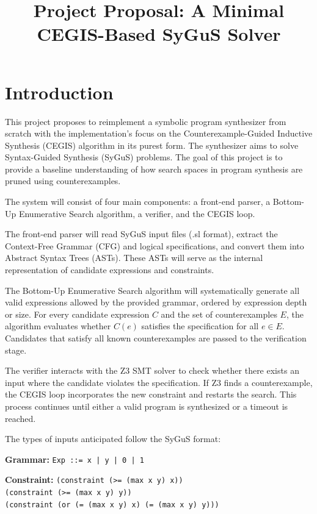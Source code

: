 \documentclass[10pt]{article}
\begin{document}
\title{Project Proposal: A Minimal CEGIS-Based SyGuS Solver}
\date{}
\maketitle

\section*{Introduction}

This project proposes to reimplement a symbolic program synthesizer from scratch with the implementation’s focus on the Counterexample-Guided Inductive Synthesis (CEGIS) algorithm in its purest form. The synthesizer aims to solve Syntax-Guided Synthesis (SyGuS) problems. The goal of this project is to provide a baseline understanding of how search spaces in program synthesis are pruned using counterexamples.

The system will consist of four main components: a front-end parser, a Bottom-Up Enumerative Search algorithm, a verifier, and the CEGIS loop.

The front-end parser will read SyGuS input files (.sl format), extract the Context-Free Grammar (CFG) and logical specifications, and convert them into Abstract Syntax Trees (ASTs). These ASTs will serve as the internal representation of candidate expressions and constraints.

The Bottom-Up Enumerative Search algorithm will systematically generate all valid expressions allowed by the provided grammar, ordered by expression depth or size. For every candidate expression $C$ and the set of counterexamples $E$, the algorithm evaluates whether $C(e)$ satisfies the specification for all $e \in E$. Candidates that satisfy all known counterexamples are passed to the verification stage.

The verifier interacts with the Z3 SMT solver to check whether there exists an input where the candidate violates the specification. If Z3 finds a counterexample, the CEGIS loop incorporates the new constraint and restarts the search. This process continues until either a valid program is synthesized or a timeout is reached.

The types of inputs anticipated follow the SyGuS format:

\textbf{Grammar:} \texttt{Exp ::= x | y | 0 | 1}

\textbf{Constraint:} 
\texttt{(constraint (>= (max x y) x))}\\
\texttt{(constraint (>= (max x y) y))}\\
\texttt{(constraint (or (= (max x y) x) (= (max x y) y)))}
\end{document}
